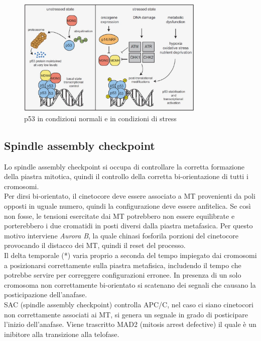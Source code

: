                 \begin{figure}[h]
                    \centering
                    \includegraphics[width=0.8\textwidth]{images/p53.JPG}
                    \caption{\small p53 in condizioni normali e in condizioni di stress}
                    \label{fig:mesh1}
                \end{figure}    
        
    \subsection{Spindle assembly checkpoint}
        Lo spindle assembly checkpoint si occupa di controllare la corretta formazione della piastra mitotica, quindi il controllo della corretta bi-orientazione di tutti i cromosomi. \\
        Per dirsi bi-orientato, il cinetocore deve essere associato a MT provenienti da poli opposti in uguale numero, quindi la configurazione deve essere anfitelica. 
        Se così non fosse, le tensioni esercitate dai MT potrebbero non essere equilibrate e porterebbero i due cromatidi in posti diversi dalla piastra metafasica.
        Per questo motivo interviene \textit{Aurora B}, la quale chinasi fosforila porzioni del cinetocore provocando il distacco dei MT, quindi il reset del processo.\\
        Il delta temporale (*) varia proprio a seconda del tempo impiegato dai cromosomi a posizionarsi correttamente sulla piastra metafisica, includendo il tempo che potrebbe servire per correggere configurazioni erronee.
        In presenza di un solo cromosoma non correttamente bi-orientato si scatenano dei segnali che causano la posticipazione dell'anafase.\\
        
        SAC (spindle assembly checkpoint) controlla APC/C, nel caso ci siano cinetocori non correttamente associati ai MT, si genera un segnale in grado di posticipare l'inizio dell'anafase. Viene trascritto MAD2 (mitosis arrest defective) il quale è un inibitore alla transizione alla telofase.
        
